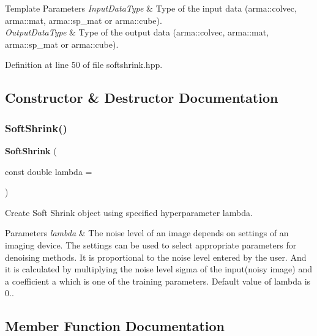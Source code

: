 \begin{DoxyTemplParams}{Template Parameters}
{\em Input\+Data\+Type} & Type of the input data (arma\+::colvec, arma\+::mat, arma\+::sp\+\_\+mat or arma\+::cube). \\
\hline
{\em Output\+Data\+Type} & Type of the output data (arma\+::colvec, arma\+::mat, arma\+::sp\+\_\+mat or arma\+::cube). \\
\hline
\end{DoxyTemplParams}


Definition at line 50 of file softshrink.\+hpp.



\subsection{Constructor \& Destructor Documentation}
\mbox{\label{classmlpack_1_1ann_1_1SoftShrink_ae697be59cee297cc5cafd9ea08117402}} 
\subsubsection{Soft\+Shrink()}
{\footnotesize\ttfamily \textbf{ Soft\+Shrink} (\begin{DoxyParamCaption}\item[{const double}]{lambda = {} }\end{DoxyParamCaption})}



Create Soft Shrink object using specified hyperparameter lambda. 


\begin{DoxyParams}{Parameters}
{\em lambda} & The noise level of an image depends on settings of an imaging device. The settings can be used to select appropriate parameters for denoising methods. It is proportional to the noise level entered by the user. And it is calculated by multiplying the noise level sigma of the input(noisy image) and a coefficient \textquotesingle{}a\textquotesingle{} which is one of the training parameters. Default value of lambda is 0.. \\
\hline
\end{DoxyParams}


\subsection{Member Function Documentation}
\mbox{\label{classmlpack_1_1ann_1_1SoftShrink_a3ad74424be92ee20e633e1008e08004b}} 
